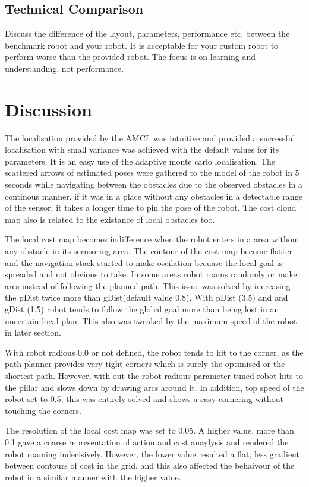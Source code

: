 \documentclass[10pt,journal,compsoc]{IEEEtran}
\begin{document}
\subsection{Technical Comparison} %
Discuss the difference of the layout, parameters, performance etc. between the benchmark robot and your robot. It is acceptable for your custom robot to perform worse than the provided robot. The focus is on learning and understanding, not performance. 

\section{Discussion}

The localisation provided by the AMCL was intuitive and provided a successful localisation with small variance was achieved with the default values for its parameters. It is an easy use of the adaptive monte carlo localisation. The scattered arrows of estimated poses were gathered to the model of the robot in 5 seconds while navigating between the obstacles due to the observed obstacles in a continous manner, if it was in a place without any obstacles in a detectable range of the sensor, it takes a longer time to pin the pose of the robot. The cost cloud map also is related to the existance of local obstacles too.

The local cost map becomes indifference when the robot enters in a area without any obstacle in its sernsoring area. The contour of the cost map become flatter and the navigation stack started to make oscilation becuase the local goal is spreaded and not obvious to take. In some areas robot roams randomly or make arcs instead of following the planned path. This issue was solved by increasing the pDist twice more than gDist(default value 0.8). With pDist (3.5) and and gDist (1.5) robot tends to follow the global goal more than being lost in an uncertain local plan. This also was tweaked by the maximum speed of the robot in later section.

With robot radious 0.0 or not defined, the robot tends to hit to the corner, as the path planner provides very tight corners which is surely the optimised or the shortest path. However, with out the robot radious parameter tuned robot hits to the pillar and slows down by drawing arcs around it. In addition, top speed of the robot set to 0.5, this was entirely solved and shows a easy cornering without touching the corners.

The resolution of the local cost map was set to 0.05. A higher value, more than 0.1 gave a coarse representation of action and cost anaylysis and rendered the robot roaming indecisively. However, the lower value resulted a flat, less gradient between contours of cost in the grid, and this also affected the behaivour of the robot in a similar manner with the higher value. 
\end{document}
